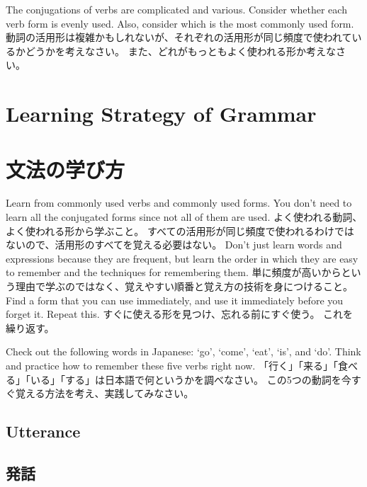 \documentclass[uplatex,dvipdfmx,b5paper,english,10pt]{jsbook}
\begin{document}
\begin{toiquestion}
\ifEnglish
The conjugations of verbs are complicated and various.
Consider whether each verb form is evenly used.
Also, consider which is the most commonly used form.
\else
動詞の活用形は複雑かもしれないが、それぞれの活用形が同じ頻度で使われているかどうかを考えなさい。
また、どれがもっともよく使われる形か考えなさい。
\fi
\end{toiquestion}

\ifEnglish
\section{Learning Strategy of Grammar}
\else
\section{文法の学び方}
\fi

\ifEnglish
Learn from commonly used verbs and commonly used forms. You don't need to learn all the conjugated forms since not all of them are used.
\else
よく使われる動詞、よく使われる形から学ぶこと。
すべての活用形が同じ頻度で使われるわけではないので、活用形のすべてを覚える必要はない。
\fi
\ifEnglish
Don't just learn words and expressions because they are frequent, but learn the order in which they are easy to remember and the techniques for remembering them.
\else
単に頻度が高いからという理由で学ぶのではなく、覚えやすい順番と覚え方の技術を身につけること。
\fi
\ifEnglish
Find a form that you can use immediately, and use it immediately before you forget it. Repeat this.
\else
すぐに使える形を見つけ、忘れる前にすぐ使う。
これを繰り返す。
\fi

\begin{toiquestion}
\ifEnglish
Check out the following words in Japanese: `go', `come', `eat', `is', and `do'.
Think and practice how to remember these five verbs right now.
\else
「行く」「来る」「食べる」「いる」「する」は日本語で何というかを調べなさい。
この5つの動詞を今すぐ覚える方法を考え、実践してみなさい。
\fi
\end{toiquestion}


\ifEnglish
\subsection{Utterance}
\else
\subsection{発話}
\fi
\end{document}
